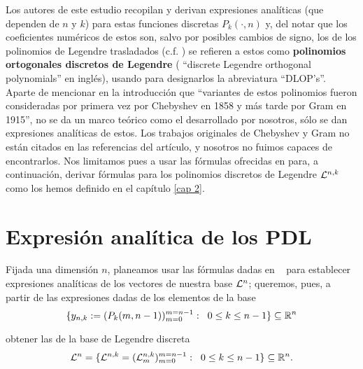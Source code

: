Los autores de este estudio recopilan y derivan expresiones
analíticas (que dependen de $n$ y $k$) para estas funciones
discretas $P_{k}(\cdot ,n)$ y, del notar que los coeficientes
numéricos de estos son, salvo por posibles cambios de signo,
los de los polinomios de Legendre trasladados 
(c.f. \cite{leg})
se refieren a 
estos como \textbf{polinomios ortogonales
discretos de Legendre} (
``discrete Legendre orthogonal
polynomials'' en inglés), usando para designarlos la abreviatura
``DLOP's''. \\

Aparte de mencionar en la introducción que
``variantes de estos polinomios fueron consideradas por primera
vez por Chebyshev en 1858 y más tarde por Gram en 1915'', no se
da un marco teórico como el desarrollado por nosotros, sólo 
se dan expresiones analíticas de estos.
Los trabajos originales de Chebyshev y Gram
no están citados en las referencias del artículo, y 
nosotros no fuimos capaces de 
encontrarlos. Nos limitamos pues a usar las 
fórmulas ofrecidas en \cite{Neuman} para, a continuación,
derivar fórmulas para los polinomios discretos
de Legendre $\mathcal{L}^{n,k}$
como los hemos definido en el capítulo 
\ref{cap 2}.


\section{Expresión analítica de los PDL}
Fijada una dimensión $n$, planeamos usar 
las fórmulas dadas 
en ~\cite{Neuman}
para establecer expresiones analíticas
de los vectores de nuestra base $\mathcal{L}^{n}$; queremos,
pues, a partir de las expresiones dadas de los
elementos de la base
\begin{equation}
\label{eq: base DLOP}
\{
y_{n,k}:= (P_{k}(m, n-1))_{m=0}^{m=n-1}
: \hspace{0.2cm} 0 \leq k \leq n-1
\} \subseteq \mathbb{R}^{n}
\end{equation}

\noindent
obtener las de la base de Legendre discreta
\begin{equation}
\label{eq: base Legendre}
\mathcal{L}^{n}=
\{
\mathcal{L}^{n,k}= (\mathcal{L}^{n,k}_{m})_{m=0}^{m=n-1}
: \hspace{0.2cm} 0 \leq k \leq n-1
\}\subseteq \mathbb{R}^{n}.
\end{equation}


